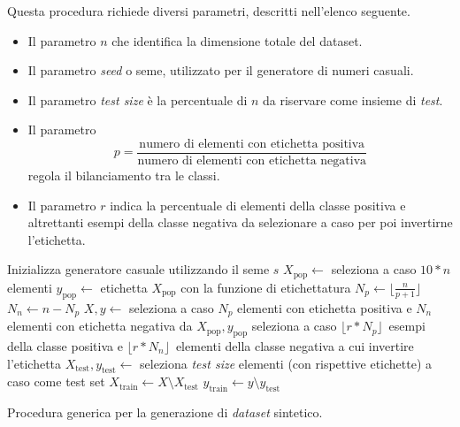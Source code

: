 Questa procedura richiede diversi parametri, descritti nell'elenco seguente.
\begin{itemize}
    \item Il parametro $n$ che identifica la dimensione totale del dataset.
    \item Il parametro \emph{seed} o seme, utilizzato per il generatore di numeri casuali.
    \item Il parametro \emph{test size} è la percentuale di $n$ da riservare come insieme di \emph{test}.
    \item Il parametro 
    \begin{equation*}
        p = \frac{\text{numero di elementi con etichetta positiva}}{\text{numero di elementi con etichetta negativa}}
    \end{equation*} 
    regola il bilanciamento tra le classi.
    \item Il parametro $r$ indica la percentuale di elementi della classe positiva e altrettanti esempi della classe negativa da selezionare a caso per poi invertirne l'etichetta.
\end{itemize}
\begin{algorithm}
    \SetAlgoLined
    Inizializza generatore casuale utilizzando il seme $s$\;
    $X_{\text{pop}} \gets$ seleziona a caso $10*n$ elementi\;
    $y_{\text{pop}} \gets$ etichetta $X_{\text{pop}}$ con la funzione di etichettatura\;
    $N_p \gets \lfloor\frac{n}{p + 1}\rfloor$\;
    $N_n \gets n - N_p$\;
    $X, y \gets$ seleziona a caso $N_p$ elementi con etichetta positiva e $N_n$ elementi con etichetta negativa da $X_{\text{pop}},y_{\text{pop}}$\;
    seleziona a caso $\lfloor r * N_p \rfloor$\ esempi della classe positiva e $\lfloor r * N_n \rfloor$\ elementi della classe negativa a cui invertire l'etichetta\;
    $X_{\text{test}}, y_{\text{test}} \gets$ seleziona \emph{test size} elementi (con rispettive etichette) a caso come test set\;
    $X_{\text{train}} \gets X \setminus X_{\text{test}}$\;
    $y_{\text{train}} \gets y \setminus y_{\text{test}}$\;
\caption{Procedura generica per la generazione di \emph{dataset} sintetico.}
\label{alg:generazione_dataset_sintetici}
\end{algorithm}

